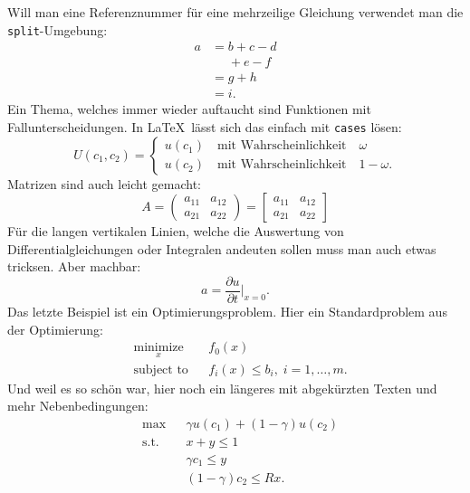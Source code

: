 Will man eine Referenznummer für eine mehrzeilige Gleichung verwendet man die \texttt{split}-Umgebung:
\begin{equation}
	\begin{split}
		a &= b + c - d\\
		 &\phantom{=} + e - f\\
		 &= g + h\\
		 &= i.
	\end{split}
\end{equation}
Ein Thema, welches immer wieder auftaucht sind Funktionen mit Fallunterscheidungen. In \LaTeX~lässt sich das einfach mit \texttt{cases} lösen:
\begin{equation}
	U(c_1,c_2) = 
	\begin{cases}
		u(c_1) \quad \text{mit Wahrscheinlichkeit} \quad \omega\\
		u(c_2) \quad \text{mit Wahrscheinlichkeit} \quad 1 - \omega.
	\end{cases}
\end{equation}
Matrizen sind auch leicht gemacht:
\begin{equation}
	A = \begin{pmatrix} a_{11} & a_{12} \\ a_{21} & a_{22} \end{pmatrix}
     = \begin{bmatrix} a_{11} & a_{12} \\ a_{21} & a_{22} \end{bmatrix}
\end{equation}
Für die langen vertikalen Linien, welche die Auswertung von Differentialgleichungen oder Integralen andeuten sollen muss man auch etwas tricksen. Aber machbar:
\begin{equation}
	a = \frac{\partial u}{\partial t}\bigg\lvert_{x=0}.
\end{equation}
Das letzte Beispiel ist ein Optimierungsproblem. Hier ein Standardproblem aus der Optimierung:
\begin{equation}
	\begin{aligned}
		& \underset{x}{\text{minimize}}
		& & f_0(x) \\
		& \text{subject to}
		& & f_i(x) \leq b_i, \; i = 1, \ldots, m.
	\end{aligned}
\end{equation}
Und weil es so schön war, hier noch ein längeres mit abgekürzten Texten und mehr Nebenbedingungen:
\begin{equation}
	\label{eq:maximizationProb}
	\begin{aligned}
		& \text{max}
		& & \gamma u(c_1) + (1 - \gamma) u(c_2) \\
		& \text{s.t.} & &  x + y \leq 1 \\
		& & &  \gamma c_1 \leq y \\
		& & &  (1 - \gamma) c_2 \leq Rx. \\
	\end{aligned}
\end{equation}

